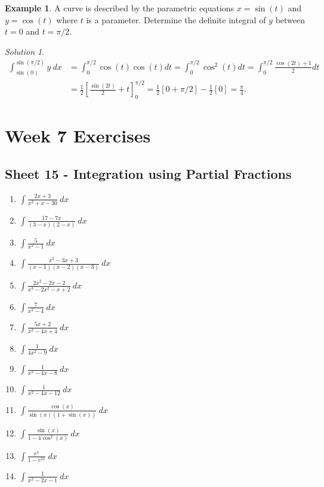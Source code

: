 \documentclass[
  11pt,
  oneside]{book}
\providecommand{\tightlist}{%
  \setlength{\itemsep}{0pt}\setlength{\parskip}{0pt}}
\newcommand{\slide}{}
\theoremstyle{definition}
\theoremstyle{definition}
\newtheorem{example}{Example}[chapter]
\theoremstyle{definition}
\theoremstyle{definition}
\theoremstyle{remark}
\newtheorem*{solution}{Solution}
\begin{document}
\slide

\begin{example}
A curve is described by the parametric equations \(x = \sin(t)\) and \(y = \cos(t)\) where \(t\) is a parameter. Determine the definite integral of \(y\) between \(t = 0\) and \(t = \pi/2\).
\end{example}

\begin{solution}
\begin{align*}
\int_{\sin(0)}^{\sin(\pi/2)}y\ dx& = \int_0^{\pi/2}\cos(t)\cos(t)dt = \int_0^{\pi/2}\cos^2(t)dt = \int_0^{\pi/2}\frac{\cos(2t)+1}{2}dt\\
& = \frac12\left[\frac{\sin(2t)}2+t\right]_0^{\pi/2} = \frac12\left[0+\pi/2\right]-\frac12\left[0\right]=\frac{\pi}4.
\end{align*}
\end{solution}

\chapter*{Week 7 Exercises}\label{week-7-exercises}

\section{Sheet 15 - Integration using Partial Fractions}\label{sheet-15---integration-using-partial-fractions}

\begin{enumerate}
\def\labelenumi{\arabic{enumi}.}
\tightlist
\item
  \(\displaystyle\int \frac{2x+3}{x^2+x-30}\ dx\)
\item
  \(\displaystyle\int \frac{17-7x}{(3-x)(2-x)}\ dx\)
\item
  \(\displaystyle\int \frac{5}{x^2-1}\ dx\)
\item
  \(\displaystyle\int \frac{x^2-3x+3}{(x-1)(x-2)(x-3)}\ dx\)
\item
  \(\displaystyle\int \frac{2x^2-2x-2}{x^3-2x^2-x+2}\ dx\)
\item
  \(\displaystyle\int \frac{7}{x^2-4}\ dx\)
\item
  \(\displaystyle\int \frac{5x+2}{x^2-4x+4}\ dx\)
\item
  \(\displaystyle\int \frac{1}{4x^2-9}\ dx\)
\item
  \(\displaystyle\int \frac{1}{x^2-4x-8}\ dx\)
\item
  \(\displaystyle\int \frac{1}{x^2-4x-12}\ dx\)
\item
  \(\displaystyle\int \frac{\cos(x)}{\sin(x)(1+\sin(x))}\ dx\)
\item
  \(\displaystyle\int \frac{\sin(x)}{1-4\cos^2(x)}\ dx\)
\item
  \(\displaystyle\int \frac{e^x}{1-e^{2x}}\ dx\)
\item
  \(\displaystyle\int \frac{1}{x^2-2x-1}\ dx\)
\end{enumerate}
\end{document}
